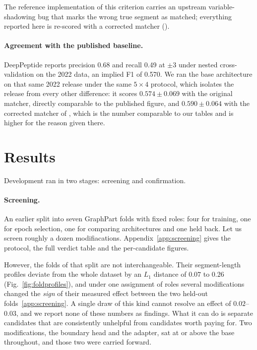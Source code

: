 \documentclass{article}
\begin{document}
The reference implementation of this criterion carries an upstream variable-shadowing bug that marks the wrong true segment as matched; everything reported here is re-scored with a corrected matcher ().

\paragraph{Agreement with the published baseline.} DeepPeptide reports precision 0.68 and recall 0.49 at $\pm3$ under nested cross-validation on the 2022 data, an implied F1 of 0.570. We ran the base architecture on that same 2022 release under the same $5\times4$ protocol, which isolates the release from every other difference: it scores $0.574\pm0.069$ with the original matcher, directly comparable to the published figure, and $0.590\pm0.064$ with the corrected matcher of , which is the number comparable to our tables and is higher for the reason given there. %


\section{Results}
\label{sec:results}

Development ran in two stages: screening and confirmation. 
 
\paragraph{Screening.} An earlier split into seven GraphPart folds with fixed roles: four for training, one for epoch selection, one for comparing
architectures and one held back. Let us screen roughly a dozen modifiacations. Appendix~\ref{app:screening} gives the protocol, the full verdict table and the per-candidate figures.
 
However, the folds of that split are not interchangeable. Their segment-length profiles deviate from the whole dataset by an $L_1$ distance of $0.07$ to $0.26$ (Fig.~\ref{fig:foldprofiles}), and under one assignment of roles several modifications changed the \emph{sign} of their measured effect between the two held-out folds~\ref{app:screening}. A single draw of this kind cannot resolve an effect of $0.02$--$0.03$, and we report none of these numbers as findings. What it can do is separate candidates that are consistently unhelpful from candidates worth paying for. Two modifications, the boundary head and the adapter, sat at or above
the base throughout, and those two were carried forward.
 
\end{document}
